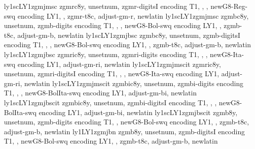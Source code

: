 {ly1sc}{LY1}{zgmj}{m}{sc}{}
%
{zgmrc8y,%
unsetnum,%
zgmr-digitsI encoding T1,%
\metrics {}  ,%
\metrics {},%
newG8-Reg-swq encoding LY1,%
\metrics {},%
zgmr-t8c,%
adjust-gm-r,%
newlatin}
{ly1sc}{LY1}{zgmj}{m}{sc}{}
%
{zgmbc8y,%
unsetnum,%
zgmb-digits encoding T1,%
\metrics {}  ,%
\metrics {},%
newG8-Bol-swq encoding LY1,%
\metrics {},%
zgmb-t8c,%
adjust-gm-b,%
newlatin}
{ly1sc}{LY1}{zgmj}{b}{sc}{}
%
{zgmbc8y,%
unsetnum,%
zgmb-digitsI encoding T1,%
\metrics {}  ,%
\metrics {},%
newG8-Bol-swq encoding LY1,%
\metrics {},%
zgmb-t8c,%
adjust-gm-b,%
newlatin}
{ly1sc}{LY1}{zgmj}{b}{sc}{}
%
{zgmric8y,%
unsetnum,%
zgmri-digits encoding T1,%
\metrics {}  ,%
\metrics {},%
newG8-Ita-swq encoding LY1,%
adjust-gm-ri,%
newlatin}
{ly1sc}{LY1}{zgmj}{m}{scit}{}
%
{zgmric8y,%
unsetnum,%
zgmri-digitsI encoding T1,%
\metrics {}  ,%
\metrics {},%
newG8-Ita-swq encoding LY1,%
adjust-gm-ri,%
newlatin}
{ly1sc}{LY1}{zgmj}{m}{scit}{}
%
{zgmbic8y,%
unsetnum,%
zgmbi-digits encoding T1,%
\metrics {}  ,%
\metrics {},%
newG8-BolIta-swq encoding LY1,%
adjust-gm-bi,%
newlatin}
{ly1sc}{LY1}{zgmj}{b}{scit}{}
%
{zgmbic8y,%
unsetnum,%
zgmbi-digitsI encoding T1,%
\metrics {}  ,%
\metrics {},%
newG8-BolIta-swq encoding LY1,%
adjust-gm-bi,%
newlatin}
{ly1sc}{LY1}{zgmj}{b}{scit}{}
%
{zgmb8y,%
unsetnum,%
zgmb-digits encoding T1,%
\metrics {},%
newG8-Bol-swq encoding LY1,%
\metrics {},%
zgmb-t8c,%
adjust-gm-b,%
newlatin}
{ly1}{LY1}{zgmj}{b}{n}{}
%
{zgmb8y,%
unsetnum,%
zgmb-digitsI encoding T1,%
\metrics {},%
newG8-Bol-swq encoding LY1,%
\metrics {},%
zgmb-t8c,%
adjust-gm-b,%
newlatin}
